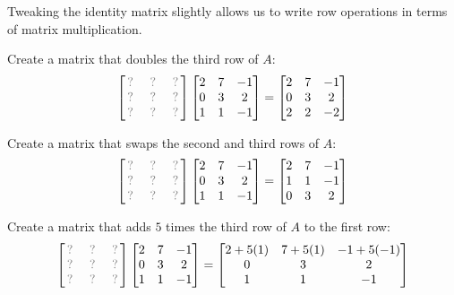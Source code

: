 \begin{activity}{20}
Tweaking the identity matrix slightly allows us to write row operations
in terms of matrix multiplication.
\begin{subactivity}
Create a matrix that doubles the third row of \(A\):
\[
 \begin{bmatrix} \unknown & \unknown & \unknown \\ \unknown & \unknown & \unknown \\ \unknown & \unknown & \unknown \end{bmatrix}
 \begin{bmatrix} 2 & 7 & -1 \\ 0 & 3 & 2 \\ 1 & 1 & -1 \end{bmatrix}
=
 \begin{bmatrix} 2 & 7 & -1 \\ 0 & 3 & 2 \\ 2 & 2 & -2 \end{bmatrix}
\]
\end{subactivity}
\begin{subactivity}
  Create a matrix that swaps the second and third rows of \(A\):
  \[
   \begin{bmatrix} \unknown & \unknown & \unknown \\ \unknown & \unknown & \unknown \\ \unknown & \unknown & \unknown \end{bmatrix}
   \begin{bmatrix} 2 & 7 & -1 \\ 0 & 3 & 2 \\ 1 & 1 & -1 \end{bmatrix}
  =
  \begin{bmatrix} 2 & 7 & -1 \\ 1 & 1 & -1 \\ 0 & 3 & 2 \end{bmatrix}
  \]
\end{subactivity}
\begin{subactivity}
Create a matrix that adds \(5\) times the third row of \(A\) to the first row:
\[
 \begin{bmatrix} \unknown & \unknown & \unknown \\ \unknown & \unknown & \unknown \\ \unknown & \unknown & \unknown \end{bmatrix}
 \begin{bmatrix} 2 & 7 & -1 \\ 0 & 3 & 2 \\ 1 & 1 & -1 \end{bmatrix}
=
 \begin{bmatrix} 2+5(1) & 7+5(1) & -1+5(-1) \\ 0 & 3 & 2 \\ 1 & 1 & -1 \end{bmatrix}
\]
\end{subactivity}
\end{activity}

